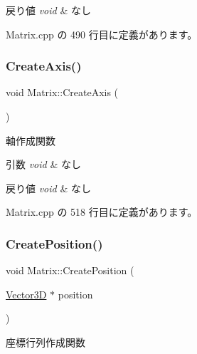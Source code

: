 \begin{DoxyRetVals}{戻り値}
{\em void} & なし \\
\hline
\end{DoxyRetVals}


 Matrix.\+cpp の 490 行目に定義があります。

\mbox{\label{class_matrix_a57e542a9008a8ceb9a7608debb318d04}} 
\subsubsection{\texorpdfstring{Create\+Axis()}{CreateAxis()}}
{\footnotesize\ttfamily void Matrix\+::\+Create\+Axis (\begin{DoxyParamCaption}{ }\end{DoxyParamCaption})\hspace{0.3cm}{\ttfamily [private]}}



軸作成関数 


\begin{DoxyParams}{引数}
{\em void} & なし \\
\hline
\end{DoxyParams}

\begin{DoxyRetVals}{戻り値}
{\em void} & なし \\
\hline
\end{DoxyRetVals}


 Matrix.\+cpp の 518 行目に定義があります。

\mbox{\label{class_matrix_aef12300dcca7a1256e8437dcc6619b56}} 
\subsubsection{\texorpdfstring{Create\+Position()}{CreatePosition()}}
{\footnotesize\ttfamily void Matrix\+::\+Create\+Position (\begin{DoxyParamCaption}\item[{\mbox{\hyperlink{class_vector3_d}{Vector3D}} $\ast$}]{position }\end{DoxyParamCaption})}



座標行列作成関数 


